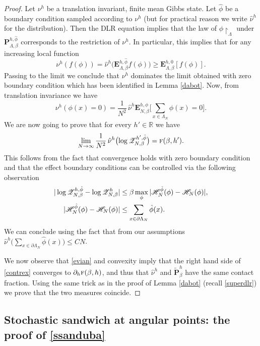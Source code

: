 \documentclass[JEP,XML,SOM,Unicode, NoFloatCountersInSection]{cedram}
\let\mathcal\mathscr
\numberwithin{equation}{section}
\theoremstyle{plain}
\theoremstyle{definition}
\newcommand{\restrict}{\!\!\upharpoonright}
\newcommand{\cH}{{\ensuremath{\mathcal H}} }
\newcommand{\cZ}{{\ensuremath{\mathcal Z}} }
\newcommand{\bP}{{\ensuremath{\mathbf P}} }
\newcommand{\bE}{{\ensuremath{\mathbf E}} }
\newcommand{\bbR}{{\ensuremath{\mathbb R}} }
\newcommand{\gb}{\beta}
\newcommand{\gL}{\Lambda}
\newcommand{\tf}{\textsc{f}}
\begin{document}
\begin{proof}
Let $\nu^h$ be a translation invariant, finite mean Gibbs state.
Let $\hat \phi$ be a boundary condition sampled according to $\nu^h$ (but for practical reason we write $\hat \nu^h$ for the distribution).
Then the DLR equation implies that the law of $\phi\restrict_{\gL}$ under $\bP^{h,\hat \phi}_{\gL,\gb}$ corresponds to the restriction of $\nu^h$.
In particular, this implies that for any increasing local function
\begin{equation*}
\nu^h(f(\phi))=\hat \nu^h\bigl(\bE^{h,\hat \phi}_{\gL,\gb}f(\phi)\bigr)\ge \bE^{h,0}_{\gL,\gb}[f(\phi)].
\end{equation*}
Passing to the limit we conclude that $\nu^h$ dominates the limit obtained with zero boundary condition which has been identified in Lemma \ref{dabot}.
Now, from translation invariance we have
\begin{equation}\label{contrex}
\nu^h(\phi(x)=0)=\frac{1}{N^2}\,\hat \nu^{h}\bE^{h,\hat \phi}_{N,\gb}\biggl[\sum_{x\in \gL_N} \phi(x)=0\biggr].
\end{equation}
We are now going to prove that for every $h'\in \bbR$ we have
\begin{equation}\label{evian}
\lim_{N\to \infty}\frac{1}{N^2}\,\hat \nu^{h}\bigl(\log \cZ^{h',\hat \phi}_{N,\gb}\bigr)=\tf(\gb,h').
\end{equation}
This follows from the fact that convergence holds with zero boundary condition
and that the effect boundary conditions can be controlled via the following observation
\begin{align*}
|\log \cZ^{h,\hat \phi}_{N,\gb}-\log \cZ^{h}_{N,\gb}|&\le \gb\max_{\phi}|\cH^{\hat \phi}_{N}(\phi)- \cH_{N}(\phi)|,\notag
\\
|\cH^{\hat \phi}_{N}(\phi)- \cH_{N}(\phi)|&\le \sum_{x\in \partial \gL_N} \hat \phi(x).
\end{align*}
We can conclude using the fact that from our assumptions $\hat \nu^h\bigl(\sum_{x\in \partial \gL_N} \hat \phi(x)\bigr)\le CN$.

We now observe that \eqref{evian} and convexity imply that the right hand side of \eqref{contrex} converges to $\partial_h\tf(\gb,h)$,
and thus that $\hat \nu^h$ and $\tilde \bP^h_{\gb}$ have the same contact fraction.
Using the same trick as in the proof of Lemma \ref{dabot} (recall \eqref{superdlr}) we prove that the two measures coincide.
\end{proof}

\subsection{Stochastic sandwich at angular points: the proof of \eqref{ssanduba}}\label{sanduba}
\end{document}
